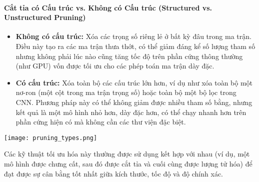 \paragraph{Cắt tỉa có Cấu trúc vs. Không có Cấu trúc (Structured vs. Unstructured Pruning)}
\begin{itemize}
    \item \textbf{Không có cấu trúc:} Xóa các trọng số riêng lẻ ở bất kỳ đâu trong ma trận. Điều này tạo ra các ma trận thưa thớt, có thể giảm đáng kể số lượng tham số nhưng không phải lúc nào cũng tăng tốc độ trên phần cứng thông thường (như GPU) vốn được tối ưu cho các phép toán ma trận dày đặc.
    \item \textbf{Có cấu trúc:} Xóa toàn bộ các cấu trúc lớn hơn, ví dụ như xóa toàn bộ một nơ-ron (một cột trong ma trận trọng số) hoặc toàn bộ một bộ lọc trong CNN. Phương pháp này có thể không giảm được nhiều tham số bằng, nhưng kết quả là một mô hình nhỏ hơn, dày đặc hơn, có thể chạy nhanh hơn trên phần cứng hiện có mà không cần các thư viện đặc biệt.
\end{itemize}

\begin{center}
    \texttt{[image: pruning\_types.png]}
    \label{fig:pruning_types}
\end{center}

Các kỹ thuật tối ưu hóa này thường được sử dụng kết hợp với nhau (ví dụ, một mô hình được chưng cất, sau đó được cắt tỉa và cuối cùng được lượng tử hóa) để đạt được sự cân bằng tốt nhất giữa kích thước, tốc độ và độ chính xác.